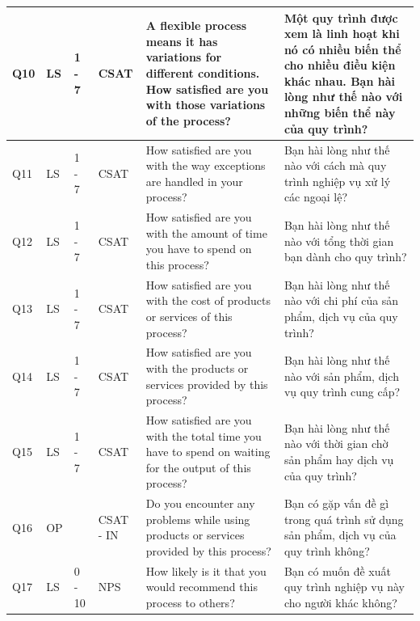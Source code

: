 \begin{center}
    \begin{tabular}{|p{1cm} |p{1cm} |p{1cm}| p{1cm} | p{5cm} | p{5cm} |}
    \hline
         Q10 & LS & 1 - 7 & CSAT & A flexible process means it has variations for different conditions. How satisfied are you with those variations of the process? & Một quy trình được xem là linh hoạt khi nó có nhiều biến thể cho nhiều điều kiện khác nhau. Bạn hài lòng như thế nào với những biến thể này của quy trình? \\
 \hline
 Q11 & LS & 1 - 7 & CSAT & How satisfied are you with the way exceptions are handled in your process? & Bạn hài lòng như thế nào với cách mà quy trình nghiệp vụ xử lý các ngoại lệ? \\
 \hline
 Q12 & LS & 1 - 7 & CSAT & How satisfied are you with the amount of time you have to spend on this process? & Bạn hài lòng như thế nào với tổng thời gian bạn dành cho quy trình? \\
 \hline
 Q13 & LS & 1 - 7 & CSAT & How satisfied are you with the cost of products or services of this process? & Bạn hài lòng như thế nào với chi phí của sản phẩm, dịch vụ của quy trình? \\
 \hline
 Q14 & LS & 1 - 7 & CSAT & How satisfied are you with the products or services provided by this process? & Bạn hài lòng như thế nào với sản phẩm, dịch vụ quy trình cung cấp? \\
 \hline
 Q15 & LS & 1 - 7 & CSAT & How satisfied are you with the total time you have to spend on waiting for the output of this process? & Bạn hài lòng như thế nào với thời gian chờ sản phẩm hay dịch vụ của quy trình? \\

 \hline
 Q16 & OP &  & CSAT - IN & Do you encounter any problems while using products or services provided by this process? & Bạn có gặp vấn đề gì trong quá trình sử dụng sản phẩm, dịch vụ của quy trình không? \\
 \hline
 Q17 & LS & 0 - 10 & NPS & How likely is it that you would recommend this process to others? & Bạn có muốn đề xuất quy trình nghiệp vụ này cho người khác không? \\ [1ex]
 \hline
    \end{tabular}
\end{center}
